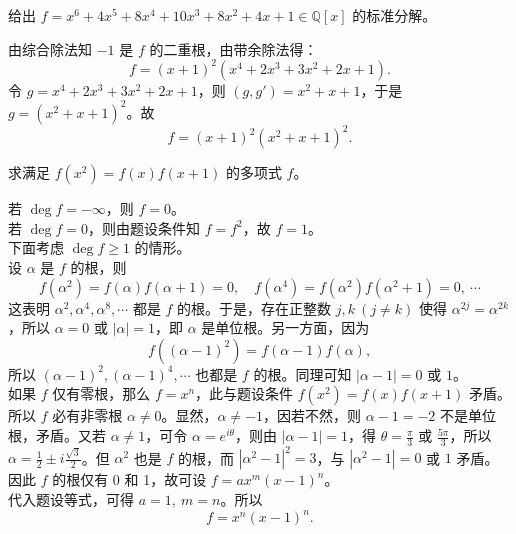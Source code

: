 \documentclass[lang=cn,12pt]{elegantbook}
\begin{document}
\begin{example}
     给出 \( f = x^6 + 4x^5 + 8x^4 + 10x^3 + 8x^2 + 4x + 1 \in \mathbb{Q}[x] \) 的标准分解。
\end{example}

\begin{solution}
    由综合除法知 \(-1\) 是 \( f \) 的二重根，由带余除法得：
    \[
    f = (x+1)^2 \left( x^4 + 2x^3 + 3x^2 + 2x + 1 \right).
    \]
    令 \( g = x^4 + 2x^3 + 3x^2 + 2x + 1 \)，则 \( (g, g') = x^2 + x + 1 \)，于是 \( g = (x^2 + x + 1)^2 \)。故
    \[
    f = (x + 1)^2 (x^2 + x + 1)^2.
    \]
\end{solution}

 \begin{example}
     求满足 \( f(x^2) = f(x)f(x+1) \) 的多项式 \( f \)。
 \end{example}

 \begin{solution}
     若 \( \deg f = -\infty \)，则 \( f = 0 \)。\\
    若 \( \deg f = 0 \)，则由题设条件知 \( f = f^2 \)，故 \( f = 1 \)。\\
    下面考虑 \( \deg f \geq 1 \) 的情形。\\
    设 \( \alpha \) 是 \( f \) 的根，则
    \[
    f(\alpha^2) = f(\alpha)f(\alpha + 1) = 0,\quad f(\alpha^4) = f(\alpha^2)f(\alpha^2 + 1) = 0,\ \cdots
    \]
    这表明 \( \alpha^2, \alpha^4, \alpha^8, \cdots \) 都是 \( f \) 的根。于是，存在正整数 \( j,k\ (j \neq k) \) 使得 \( \alpha^{2j} = \alpha^{2k} \)，所以 \( \alpha = 0 \) 或 \( |\alpha| = 1 \)，即 \( \alpha \) 是单位根。另一方面，因为
    \[
    f\left((\alpha - 1)^2\right) = f(\alpha - 1)f(\alpha),
    \]
    所以 \( (\alpha - 1)^2, (\alpha - 1)^4, \cdots \) 也都是 \( f \) 的根。同理可知 \( |\alpha - 1| = 0 \) 或 \( 1 \)。\\
    如果 \( f \) 仅有零根，那么 \( f = x^n \)，此与题设条件 \( f(x^2) = f(x)f(x+1) \) 矛盾。所以 \( f \) 必有非零根 \( \alpha \neq 0 \)。显然，\( \alpha \neq -1 \)，因若不然，则 \( \alpha - 1 = -2 \) 不是单位根，矛盾。又若 \( \alpha \neq 1 \)，可令 \( \alpha = e^{i\theta} \)，则由 \( |\alpha - 1| = 1 \)，得 \( \theta = \frac{\pi}{3} \) 或 \( \frac{5\pi}{3} \)，所以 \( \alpha = \frac{1}{2} \pm i \frac{\sqrt{3}}{2} \)。但 \( \alpha^2 \) 也是 \( f \) 的根，而 \( |\alpha^2 - 1|^2 = 3 \)，与 \( |\alpha^2 - 1| = 0 \) 或 \( 1 \) 矛盾。因此 \( f \) 的根仅有 0 和 1，故可设 \( f = ax^m(x-1)^n \)。\\
    代入题设等式，可得 \( a = 1,\ m = n \)。所以
    \[
    f = x^n(x-1)^n.
    \]
 \end{solution}
\end{document}
